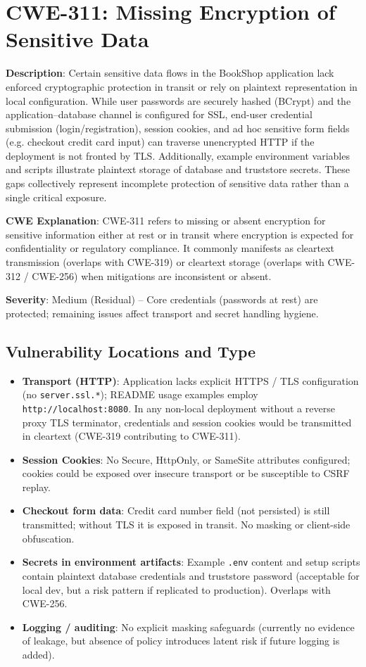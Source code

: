 \documentclass[]{UCD_CS_FYP_Report}
\begin{document}
\section{CWE-311: Missing Encryption of Sensitive Data}

	\textbf{Description}: Certain sensitive data flows in the BookShop application lack enforced cryptographic protection in transit or rely on plaintext representation in local configuration. While user passwords are securely hashed (BCrypt) and the application--database channel is configured for SSL, end-user credential submission (login/registration), session cookies, and ad hoc sensitive form fields (e.g. checkout credit card input) can traverse unencrypted HTTP if the deployment is not fronted by TLS. Additionally, example environment variables and scripts illustrate plaintext storage of database and truststore secrets. These gaps collectively represent incomplete protection of sensitive data rather than a single critical exposure.

	\textbf{CWE Explanation}: CWE-311 refers to missing or absent encryption for sensitive information either at rest or in transit where encryption is expected for confidentiality or regulatory compliance. It commonly manifests as cleartext transmission (overlaps with CWE-319) or cleartext storage (overlaps with CWE-312 / CWE-256) when mitigations are inconsistent or absent.

	\textbf{Severity}: Medium (Residual) -- Core credentials (passwords at rest) are protected; remaining issues affect transport and secret handling hygiene.

\subsection*{Vulnerability Locations and Type}
\begin{itemize}
	\item \textbf{Transport (HTTP)}: Application lacks explicit HTTPS / TLS configuration (no \texttt{server.ssl.*}); README usage examples employ \texttt{http://localhost:8080}. In any non-local deployment without a reverse proxy TLS terminator, credentials and session cookies would be transmitted in cleartext (CWE-319 contributing to CWE-311).
	\item \textbf{Session Cookies}: No Secure, HttpOnly, or SameSite attributes configured; cookies could be exposed over insecure transport or be susceptible to CSRF replay.
	\item \textbf{Checkout form data}: Credit card number field (not persisted) is still transmitted; without TLS it is exposed in transit. No masking or client-side obfuscation.
	\item \textbf{Secrets in environment artifacts}: Example \texttt{.env} content and setup scripts contain plaintext database credentials and truststore password (acceptable for local dev, but a risk pattern if replicated to production). Overlaps with CWE-256.
	\item \textbf{Logging / auditing}: No explicit masking safeguards (currently no evidence of leakage, but absence of policy introduces latent risk if future logging is added).
\end{itemize}
\end{document}
